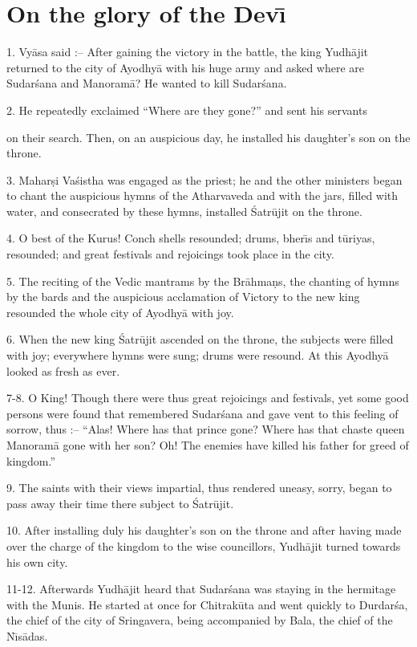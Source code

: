 \chapter{On the glory of the Dev\={\i}}

1. Vy\=asa said :-- After gaining the victory in the battle, the king Yudh\=ajit returned to the city of Ayodhy\=a with his huge army and asked where are Sudar\'sana and Manoram\=a? He wanted to kill Sudar\'sana.

2. He repeatedly exclaimed ``Where are they gone?'' and sent his servants

on their search. Then, on an auspicious day, he installed his daughter's son on the throne.

3. Mahar\d{s}i Va\'sistha was engaged as the priest; he and the other ministers began to chant the auspicious hymns of the Atharvaveda and with the jars, filled with water, and consecrated by these hymns, installed \'Satr\=ujit on the throne.

4. O best of the Kurus! Conch shells resounded; drums, bher\={\i}s and t\=uriyas, resounded; and great festivals and rejoicings took place in the city.

5. The reciting of the Vedic mantrams by the Br\=ahma\d{n}s, the chanting of hymns by the bards and the auspicious acclamation of Victory to the new king resounded the whole city of Ayodhy\=a with joy.

6. When the new king \'Satr\=ujit ascended on the throne, the subjects were filled with joy; everywhere hymns were sung; drums were resound. At this Ayodhy\=a looked as fresh as ever.

7-8. O King! Though there were thus great rejoicings and festivals, yet some good persons were found that remembered Sudar\'sana and gave vent to this feeling of sorrow, thus :-- ``Alas! Where has that prince gone? Where has that chaste queen Manoram\=a gone with her son? Oh! The enemies have killed his father for greed of kingdom.''

9. The saints with their views impartial, thus rendered uneasy, sorry, began to pass away their time there subject to \'Satr\=ujit.

10. After installing duly his daughter's son on the throne and after having made over the charge of the kingdom to the wise councillors, Yudh\=ajit turned towards his own city.

11-12. Afterwards Yudh\=ajit heard that Sudar\'sana was staying in the hermitage with the Munis. He started at once for Chitrak\=uta and went quickly to Durdar\'sa, the chief of the city of Sringavera, being accompanied by Bala, the chief of the N\={\i}s\=adas.

